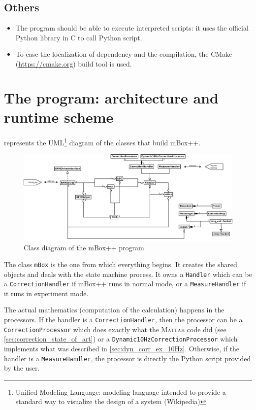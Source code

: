 \subsection{Others}
\begin{itemize}
\item The program should be able to execute interpreted scripts: it uses the official Python library in C to call Python script. 
\item To ease the localization of dependency and the compilation, the CMake (\url{https://cmake.org}) build tool is used.
\end{itemize}

\section{The program: architecture and runtime scheme}

 represents the UML\footnote{Unified Modeling Language: modeling language intended to provide a standard way to visualize the design of a system (Wikipedia)} diagram of the classes that build mBox++.

\begin{figure}
    \includegraphics[width=\linewidth]{img/mBox_classDiagram}
    \caption{\label{fig:mbox_class_diag}Class diagram of the mBox++ program}
\end{figure}

The class \texttt{mBox} is the one from which everything begins. It creates the shared objects and deals with the state machine process. It owns a \texttt{Handler} which can be a \texttt{CorrectionHandler} if mBox++ runs in normal mode, or a \texttt{MeasureHandler} if it runs in experiment mode.

The actual mathematics (computation of the calculation) happens in the processors. If the handler is a \texttt{CorrectionHandler}, then the processor can be a \texttt{CorrectionProcessor} which does exactly what the \textsc{Matlab} code did (see \cref{sec:correction_state_of_art}) or a \texttt{Dynamic10HzCorrectionProcessor} which implements what was described in \cref{sec:dyn_corr_ex_10Hz}. Otherwise, if the handler is a \texttt{MeasureHandler}, the processor is directly the Python script provided by the user.

